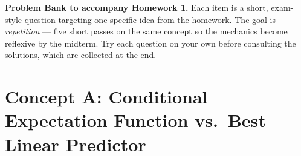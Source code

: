 \documentclass{article}
\begin{document}
\noindent\textbf{Problem Bank to accompany Homework 1.}  Each item is a short, exam-style question targeting one specific idea from the homework.  The goal is \emph{repetition} --- five short passes on the same concept so the mechanics become reflexive by the midterm.  Try each question on your own before consulting the solutions, which are collected at the end.

\bigskip

\section*{Concept A: Conditional Expectation Function vs.\ Best Linear Predictor}
\end{document}
